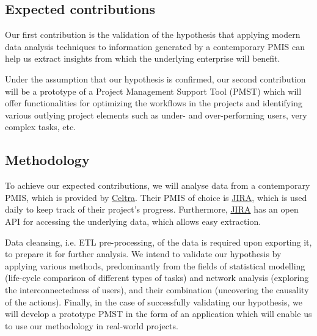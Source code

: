 \documentclass[a4paper, 12pt]{article}
\begin{document}
\subsection{Expected contributions}


Our first contribution is the validation of the hypothesis that applying modern data analysis techniques to information generated by a contemporary PMIS can help us extract insights from which the underlying enterprise will benefit. 

Under the assumption that our hypothesis is confirmed, our second contribution will be a prototype of a Project Management Support Tool (PMST) which will offer functionalities for optimizing the workflows in the projects and identifying various outlying project elements such as under- and over-performing users, very complex tasks, etc.

\subsection{Methodology}


To achieve our expected contributions, we will analyse data from a contemporary PMIS, which is provided by \href{https://www.celtra.com/}{Celtra}. Their PMIS of choice is \href{https://www.atlassian.com/software/jira}{JIRA}, which is used daily to keep track of their project’s progress. Furthermore, \href{https://www.atlassian.com/software/jira}{JIRA} has an open API for accessing the underlying data, which allows easy extraction. 

Data cleansing, i.e. ETL pre-processing, of the data is required upon exporting it, to prepare it for further analysis. We intend to validate our hypothesis by applying various methods, predominantly from the fields of statistical modelling (life-cycle comparison of different types of tasks) and network analysis (exploring the interconnectedness of users), and their combination (uncovering the causality of the actions). Finally, in the case of successfully validating our hypothesis, we will develop a prototype PMST in the form of an application which will enable us to use our methodology in real-world projects.
\end{document}
